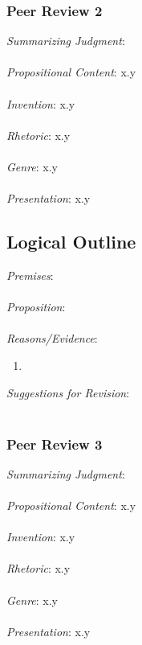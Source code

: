\documentclass[12pt]{article}
\begin{document}
\subsubsection*{Peer Review 2}
\noindent \textit{Summarizing Judgment}: \\ \\
\textit{Propositional Content}: x.y \\ \\ %
\textit{Invention}: x.y \\ \\
\textit{Rhetoric}: x.y \\ \\
\textit{Genre}: x.y \\ \\
\textit{Presentation}: x.y
\subsection*{Logical Outline}
\noindent \textit{Premises}: \\ \\
\textit{Proposition}: \\ \\
\textit{Reasons/Evidence}:
\begin{enumerate}
	\item \ %
\end{enumerate}
\textit{Suggestions for Revision}: \\\\

\subsubsection*{Peer Review 3}
\noindent \textit{Summarizing Judgment}: \\ \\
\textit{Propositional Content}: x.y \\ \\ %
\textit{Invention}: x.y \\ \\
\textit{Rhetoric}: x.y \\ \\
\textit{Genre}: x.y \\ \\
\textit{Presentation}: x.y
\end{document}
